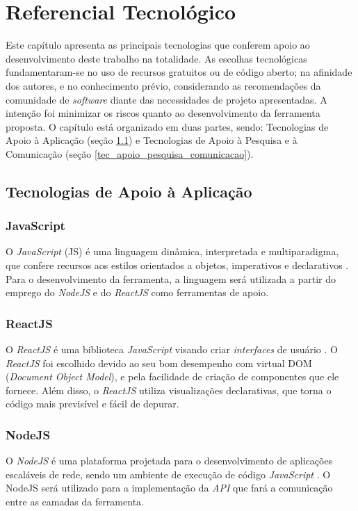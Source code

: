 \chapter[Referencial Tecnológico]{Referencial Tecnológico}

\label{chap:referencial_tecnologico}

Este capítulo apresenta as principais tecnologias que conferem apoio ao desenvolvimento deste trabalho na totalidade. As escolhas tecnológicas fundamentaram-se no uso de recursos gratuitos ou de código aberto; na afinidade dos autores, e no conhecimento prévio, considerando as recomendações da comunidade de \textit{software} diante das necessidades de projeto apresentadas. A intenção foi minimizar os riscos quanto ao desenvolvimento da ferramenta proposta. O capítulo está organizado em duas partes, sendo: Tecnologias de Apoio à Aplicação (seção \ref{tec_apoio_app}) e Tecnologias de Apoio à Pesquisa e à Comunicação (seção \ref{tec_apoio_pesquisa_comunicacao}).

\section{Tecnologias de Apoio à Aplicação}

\label{tec_apoio_app}

\subsection{JavaScript}
O \textit{JavaScript} (JS) é uma linguagem dinâmica, interpretada e multiparadigma, que confere recursos aos estilos orientados a objetos, imperativos e declarativos \cite{javascript}. Para o desenvolvimento da ferramenta, a linguagem será utilizada a partir do emprego do \textit{NodeJS} e do \textit{ReactJS} como ferramentas de apoio.

\subsection{ReactJS}
O \textit{ReactJS} é uma biblioteca \textit{JavaScript} visando criar \textit{interfaces} de usuário \cite{reactjs}. O \textit{ReactJS} foi escolhido devido ao seu bom desempenho com virtual DOM (\textit{Document Object Model}), e pela facilidade de criação de componentes que ele fornece. Além disso, o \textit{ReactJS} utiliza visualizações declarativas, que torna o código mais previsível e fácil de depurar.

\subsection{NodeJS}
O \textit{NodeJS} é uma plataforma projetada para o desenvolvimento de aplicações escaláveis de rede, sendo um ambiente de execução de código \textit{JavaScript} \cite{nodejs}. O NodeJS será utilizado para a implementação da \textit{API} que fará a comunicação entre as camadas da ferramenta.

